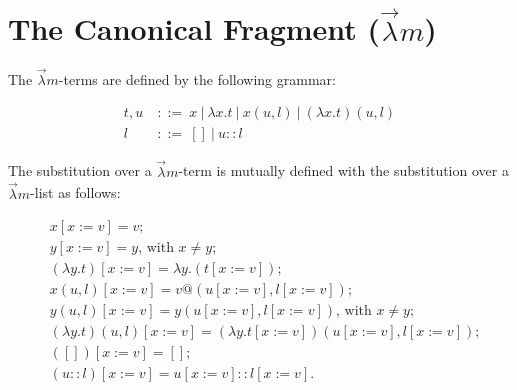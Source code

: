 \section{The Canonical Fragment ($\vec \lambda m$)}


\begin{definition}
  The $\vec \lambda m$-terms are defined by the following grammar:
  
  \begin{align*} 
    t, u \ &::= \ x \ | \ \lambda x . t \ | \ x(u, l) \ | \ (\lambda x . t)(u, l) \\
    l      &::= \ []\  | \ u :: l
  \end{align*}
\end{definition}

\begin{definition}
  The substitution over a $\vec \lambda m$-term is mutually defined with the substitution over a $\vec \lambda m$-list as follows:
  
  \begin{align*}
  & x[x := v] = v ; \\
  & y[x := v] = y \text{, with } x \neq y ; \\
  & (\lambda y . t)[x := v] = \lambda y . (t[x := v]) ; \\
  & x(u, l)[x := v] = v @ (u[x := v], l[x := v]) ; \\
  & y(u, l)[x := v] = y(u[x := v], l[x := v]) \text{, with } x \neq y ; \\
  & (\lambda y . t)(u, l)[x := v] = (\lambda y . t[x := v])(u[x := v], l[x := v]) ; \\
  & ([])[x := v] = [] ; \\
  & (u::l)[x := v] = u[x := v] :: l[x := v] .
  \end{align*}
\end{definition}

